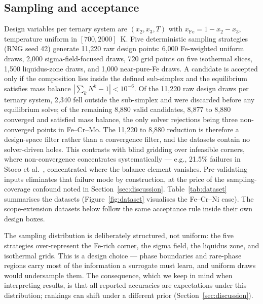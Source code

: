 \documentclass[preprint,12pt,authoryear]{elsarticle}
\newcommand{\Np}[1]{N^{#1}}
\begin{document}
\begin{table}[htbp]
\centering
\caption{Systems, probe-active phase counts $K$, and target phases.
``Eligible'' is the number of phases in the full database subset; $K$ is the
number ever observed active in the probe.}
\label{tab:systems}
\small

\end{table}

\subsection{Sampling and acceptance}

Design variables per ternary system are $(x_2, x_3, T)$ with
$x_{\mathrm{Fe}} = 1 - x_2 - x_3$, temperature uniform in $[700, 2000]$~K.
Five deterministic
sampling strategies (RNG seed 42) generate 11{,}220 raw design points:
6{,}000 Fe-weighted uniform draws, 2{,}000 sigma-field-focused draws, 720
grid points on five isothermal slices, 1{,}500 liquidus-zone draws, and
1{,}000 near-pure-Fe draws. A candidate is accepted only if the composition
lies inside the defined sub-simplex and the equilibrium satisfies mass
balance $|\sum_k \Np{k} - 1| < 10^{-6}$. Of the 11{,}220 raw design draws
per ternary system, 2{,}340 fell outside the sub-simplex and were discarded before
any equilibrium solve; of the remaining 8{,}880 valid candidates, 8{,}877
to 8{,}880 converged and satisfied mass balance, the only solver
rejections being three non-converged points in Fe--Cr--Mo. The 11{,}220 to
8{,}880 reduction is therefore a design-space filter rather than a
convergence filter, and the datasets contain no solver-driven holes. This
contrasts with blind gridding over infeasible corners, where
non-convergence concentrates systematically --- e.g., 21.5\% failures in
Stoco et al.\ \citep{stoco2026augment}, concentrated where the balance
element vanishes. Pre-validating inputs eliminates that failure mode by
construction, at the price of the sampling-coverage confound noted in
Section~\ref{sec:discussion}.
Table~\ref{tab:dataset} summarises the datasets
(Figure~\ref{fig:dataset} visualises the Fe--Cr--Ni case). The
scope-extension datasets below follow the same acceptance rule inside
their own design boxes.

The sampling distribution is deliberately structured, not uniform: the
five strategies over-represent the Fe-rich corner, the sigma field, the
liquidus zone, and isothermal grids. This is a design choice --- phase
boundaries and rare-phase regions carry most of the information a
surrogate must learn, and uniform draws would undersample them. The
consequence, which we keep in mind when interpreting results, is that all
reported accuracies are expectations under this distribution; rankings can
shift under a different prior (Section~\ref{sec:discussion}).
\end{document}
